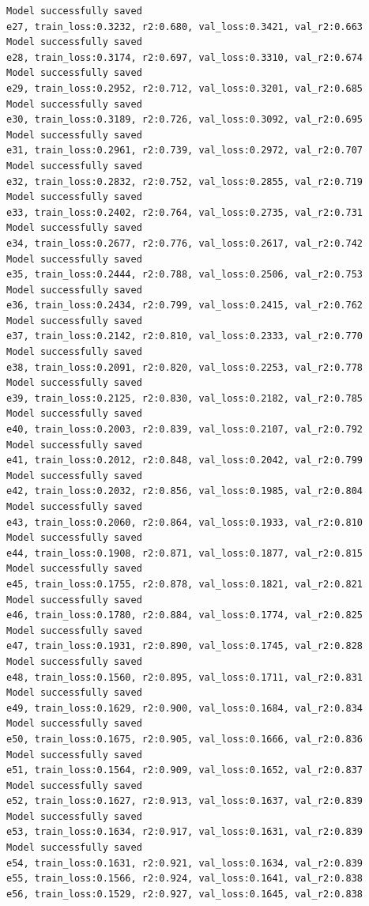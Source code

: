\documentclass[a4paper, 12pt]{article}
\begin{document}
\begin{lstlisting}
Model successfully saved
e27, train_loss:0.3232, r2:0.680, val_loss:0.3421, val_r2:0.663
Model successfully saved
e28, train_loss:0.3174, r2:0.697, val_loss:0.3310, val_r2:0.674
Model successfully saved
e29, train_loss:0.2952, r2:0.712, val_loss:0.3201, val_r2:0.685
Model successfully saved
e30, train_loss:0.3189, r2:0.726, val_loss:0.3092, val_r2:0.695
Model successfully saved
e31, train_loss:0.2961, r2:0.739, val_loss:0.2972, val_r2:0.707
Model successfully saved
e32, train_loss:0.2832, r2:0.752, val_loss:0.2855, val_r2:0.719
Model successfully saved
e33, train_loss:0.2402, r2:0.764, val_loss:0.2735, val_r2:0.731
Model successfully saved
e34, train_loss:0.2677, r2:0.776, val_loss:0.2617, val_r2:0.742
Model successfully saved
e35, train_loss:0.2444, r2:0.788, val_loss:0.2506, val_r2:0.753
Model successfully saved
e36, train_loss:0.2434, r2:0.799, val_loss:0.2415, val_r2:0.762
Model successfully saved
e37, train_loss:0.2142, r2:0.810, val_loss:0.2333, val_r2:0.770
Model successfully saved
e38, train_loss:0.2091, r2:0.820, val_loss:0.2253, val_r2:0.778
Model successfully saved
e39, train_loss:0.2125, r2:0.830, val_loss:0.2182, val_r2:0.785
Model successfully saved
e40, train_loss:0.2003, r2:0.839, val_loss:0.2107, val_r2:0.792
Model successfully saved
e41, train_loss:0.2012, r2:0.848, val_loss:0.2042, val_r2:0.799
Model successfully saved
e42, train_loss:0.2032, r2:0.856, val_loss:0.1985, val_r2:0.804
Model successfully saved
e43, train_loss:0.2060, r2:0.864, val_loss:0.1933, val_r2:0.810
Model successfully saved
e44, train_loss:0.1908, r2:0.871, val_loss:0.1877, val_r2:0.815
Model successfully saved
e45, train_loss:0.1755, r2:0.878, val_loss:0.1821, val_r2:0.821
Model successfully saved
e46, train_loss:0.1780, r2:0.884, val_loss:0.1774, val_r2:0.825
Model successfully saved
e47, train_loss:0.1931, r2:0.890, val_loss:0.1745, val_r2:0.828
Model successfully saved
e48, train_loss:0.1560, r2:0.895, val_loss:0.1711, val_r2:0.831
Model successfully saved
e49, train_loss:0.1629, r2:0.900, val_loss:0.1684, val_r2:0.834
Model successfully saved
e50, train_loss:0.1675, r2:0.905, val_loss:0.1666, val_r2:0.836
Model successfully saved
e51, train_loss:0.1564, r2:0.909, val_loss:0.1652, val_r2:0.837
Model successfully saved
e52, train_loss:0.1627, r2:0.913, val_loss:0.1637, val_r2:0.839
Model successfully saved
e53, train_loss:0.1634, r2:0.917, val_loss:0.1631, val_r2:0.839
Model successfully saved
e54, train_loss:0.1631, r2:0.921, val_loss:0.1634, val_r2:0.839
e55, train_loss:0.1566, r2:0.924, val_loss:0.1641, val_r2:0.838
e56, train_loss:0.1529, r2:0.927, val_loss:0.1645, val_r2:0.838

\end{lstlisting}
\end{document}
